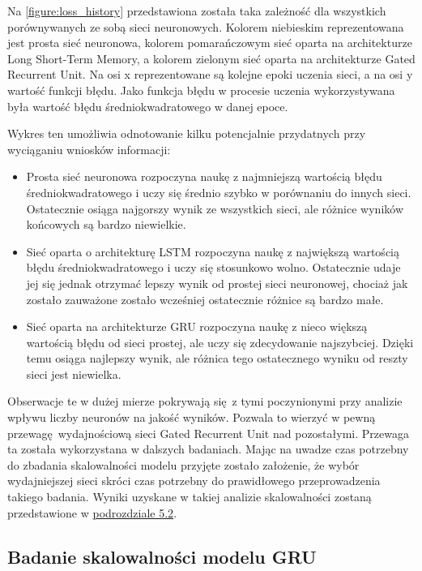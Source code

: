 \documentclass[10pt,a4paper]{article}
\begin{document}
Na \autoref{figure:loss_history} przedstawiona została taka zależność dla wszystkich porównywanych ze sobą sieci neuronowych. Kolorem niebieskim reprezentowana jest prosta sieć neuronowa, kolorem pomarańczowym sieć oparta na architekturze Long Short-Term Memory, a kolorem zielonym sieć oparta na architekturze Gated Recurrent Unit. Na osi x reprezentowane są kolejne epoki uczenia sieci, a na osi y wartość funkcji błędu. Jako funkcja błędu w procesie uczenia wykorzystywana była wartość błędu średniokwadratowego w danej epoce. 

Wykres ten umożliwia odnotowanie kilku potencjalnie przydatnych przy wyciąganiu wniosków informacji:
\begin{itemize}
	\item Prosta sieć neuronowa rozpoczyna naukę z najmniejszą wartością błędu średniokwadratowego i uczy się średnio szybko w porównaniu do innych sieci. Ostatecznie osiąga najgorszy wynik ze wszystkich sieci, ale różnice wyników końcowych są bardzo niewielkie.
	\item Sieć oparta o architekturę LSTM rozpoczyna naukę z największą wartością błędu średniokwadratowego i uczy się stosunkowo wolno. Ostatecznie udaje jej się jednak otrzymać lepszy wynik od prostej sieci neuronowej, chociaż jak zostało zauważone zostało wcześniej ostatecznie różnice są bardzo małe.
	\item Sieć oparta na architekturze GRU rozpoczyna naukę z nieco większą wartością błędu od sieci prostej, ale uczy się zdecydowanie najszybciej. Dzięki temu osiąga najlepszy wynik, ale różnica tego ostatecznego wyniku od reszty sieci jest niewielka. 
\end{itemize}

Obserwacje te w dużej mierze pokrywają się z tymi poczynionymi przy analizie wpływu liczby neuronów na jakość wyników. Pozwala to wierzyć w pewną przewagę wydajnościową sieci Gated Recurrent Unit nad pozostałymi. Przewaga ta została wykorzystana w dalszych badaniach. Mając na uwadze czas potrzebny do zbadania skalowalności modelu przyjęte zostało założenie, że wybór wydajniejszej sieci skróci czas potrzebny do prawidłowego przeprowadzenia takiego badania. Wyniki uzyskane w takiej analizie skalowalności zostaną przedstawione w \hyperlink{subsection.5.2}{podrozdziale 5.2}.

\subsection{Badanie skalowalności modelu GRU}
\end{document}

